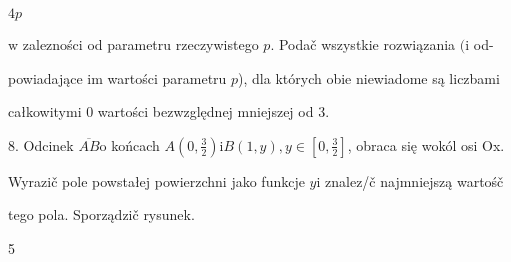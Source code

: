 \documentclass[a4paper,12pt]{article}
\begin{document}
$4p$

$\mathrm{w}$ zalezności od parametru rzeczywistego $p$. Podač wszystkie rozwiązania $(\mathrm{i}$ od-

powiadające im wartości parametru $p$), dla których obie niewiadome są liczbami

całkowitymi $0$ wartości bezwzględnej mniejszej od 3.

8. Odcinek $\overline{AB}\mathrm{o}$ końcach $A(0,\displaystyle \frac{3}{2}) \mathrm{i} B(1,y), y \in [0,\displaystyle \frac{3}{2}]$, obraca się wokól osi Ox.

Wyrazič pole powstałej powierzchni jako funkcje $y\mathrm{i}$ znalez/č najmniejszą wartośč

tego pola. Sporządzič rysunek.

5
\end{document}
